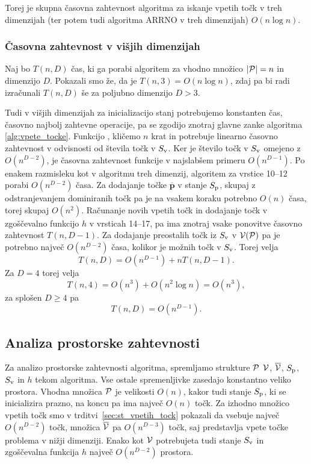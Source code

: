 Torej je skupna časovna zahtevnost algoritma za iskanje vpetih točk v treh dimenzijah (ter potem tudi algoritma ARRNO v treh dimenzijah) $O(n \log n)$.

\subsubsection{Časovna zahtevnost v višjih dimenzijah}
Naj bo $T(n, D)$ čas, ki ga porabi algoritem za vhodno množico $|\P| = n$ in dimenzijo $D$. Pokazali smo že, da je $T(n, 3) = O(n \log n)$, zdaj pa bi radi izračunali $T(n, D)$ še za poljubno dimenzijo $D > 3$.

Tudi v višjih dimenzijah za inicializacijo stanj potrebujemo konstanten čas, časovno najbolj zahtevne operacije, pa se zgodijo znotraj glavne zanke algoritma \ref{alg:vpete_tocke}. Funkcijo , kličemo $n$ krat in potrebuje linearno časovno zahtevnost v odvisnosti od števila točk v $\sv$. Ker je število točk v $\sv$ omejeno z $O(n^{D-2})$, je časovna zahtevnost funkcije v najslabšem primeru $O(n^{D-1})$. Po enakem razmisleku kot v algoritmu treh dimenzij, algoritem za vrstice 10--12 porabi $O(n^{D-2})$ časa. Za dodajanje točke $\overline{\textbf{p}}$ v stanje $\sp$, skupaj z odstranjevanjem dominiranih točk pa je na vsakem koraku potrebno $O(n)$ časa, torej skupaj $O(n^2)$. Računanje novih vpetih točk in dodajanje točk v zgoščevalno funkcijo $h$ v vrsticah 14--17, pa ima znotraj vsake ponovitve časovno zahtevnost $T(n, D-1)$. Za dodajanje preostalih točk iz $\sv$ v $\V(\P)$ pa je potrebno največ $O(n^{D-2})$ časa, kolikor je možnih točk v $\sv$. Torej velja
\[
T(n, D) = O(n^{D-1}) + n T(n, D-1).
\]
Za $D = 4$ torej velja
\[
T(n, 4) = O(n^{3}) + O(n^2 \log n) = O(n^3),
\]
za splošen $D \geq 4$ pa
\[
T(n, D) = O(n^{D-1}).
\]

\subsection{Analiza prostorske zahtevnosti}
Za analizo prostorske zahtevnosti algoritma, spremljamo strukture $\P$ $\V$, $\overline{\V}$, $\sp$, $\sv$ in $h$ tekom algoritma. Vse ostale spremenljivke zasedajo konstantno veliko prostora. Vhodna množica $\P$ je velikosti $O(n)$, kakor tudi stanje $\sp$, ki se inicializira prazno, na koncu pa ima največ $O(n)$ točk. Za izhodno množico vpetih točk smo v trditvi~\ref{sec:st_vpetih_tock} pokazali da vsebuje največ $O(n^{D-2})$ točk, množica $\overline{\V}$ pa $O(n^{D-3})$ točk, saj predstavlja vpete točke problema v nižji dimenziji. Enako kot $\V$ potrebujeta tudi stanje $\sv$ in zgoščevalna funkcija $h$ največ $O(n^{D-2})$ prostora. 

